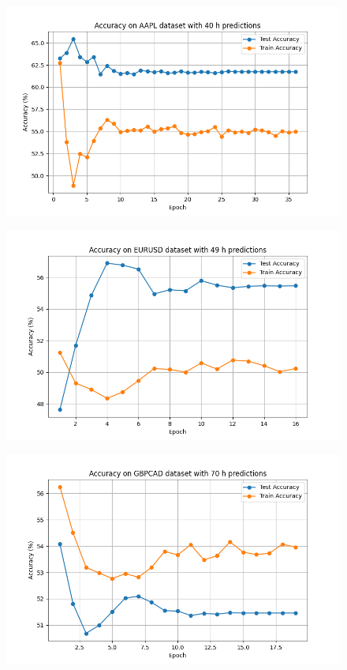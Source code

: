 \begin{figure}[h!]
  \centering
	\includegraphics[width=\linewidth]{"pictures/aapl_40h_results.png"} 
	\caption{}
	\label{fig:aapl_fig}
\end{figure}

\begin{figure}[h!]

  \centering
  \includegraphics[width=\linewidth]{"pictures/eurusd_49h_results.png"}
	\caption{}
	\label{fig:eurusud_fig}
\end{figure}

\begin{figure}[h!]

  \centering
  \includegraphics[width=\linewidth]{"pictures/gbpcad_70h_results.png"} 
	\caption{}
	\label{fig:gbpcad_fig}
\end{figure}

